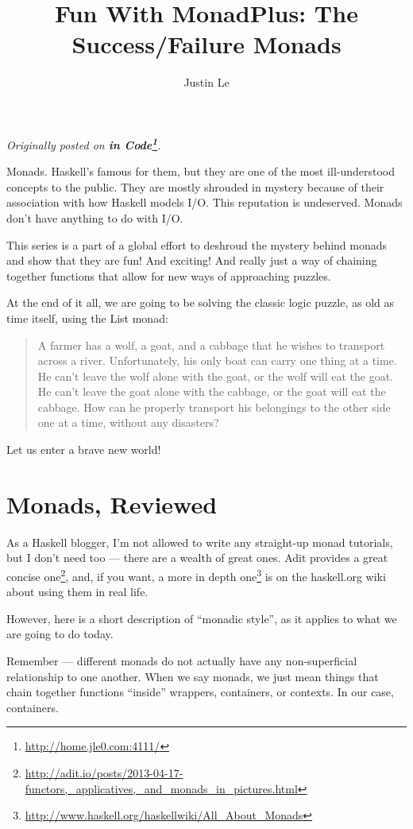 \documentclass[]{article}
\title{Fun With MonadPlus: The Success/Failure Monads}
\author{Justin Le}
\renewcommand{\href}[2]{#2\footnote{\url{#1}}}
\begin{document}
\maketitle

\emph{Originally posted on \textbf{\href{http://home.jle0.com:4111/}{in
Code}}.}

Monads. Haskell's famous for them, but they are one of the most
ill-understood concepts to the public. They are mostly shrouded in
mystery because of their association with how Haskell models I/O. This
reputation is undeserved. Monads don't have anything to do with I/O.

This series is a part of a global effort to deshroud the mystery behind
monads and show that they are fun! And exciting! And really just a way
of chaining together functions that allow for new ways of approaching
puzzles.

At the end of it all, we are going to be solving the classic logic
puzzle, as old as time itself, using the List monad:

\begin{quote}
A farmer has a wolf, a goat, and a cabbage that he wishes to transport
across a river. Unfortunately, his only boat can carry one thing at a
time. He can't leave the wolf alone with the goat, or the wolf will eat
the goat. He can't leave the goat alone with the cabbage, or the goat
will eat the cabbage. How can he properly transport his belongings to
the other side one at a time, without any disasters?
\end{quote}

Let us enter a brave new world!

\section{Monads, Reviewed}\label{monads-reviewed}

As a Haskell blogger, I'm not allowed to write any straight-up monad
tutorials, but I don't need too --- there are a wealth of great ones.
\href{http://adit.io/posts/2013-04-17-functors,_applicatives,_and_monads_in_pictures.html}{Adit
provides a great concise one}, and, if you want,
\href{http://www.haskell.org/haskellwiki/All_About_Monads}{a more in
depth one} is on the haskell.org wiki about using them in real life.

However, here is a short description of ``monadic style'', as it applies
to what we are going to do today.

Remember --- different monads do not actually have any non-superficial
relationship to one another. When we say monads, we just mean things
that chain together functions ``inside'' wrappers, containers, or
contexts. In our case, containers.
\end{document}
